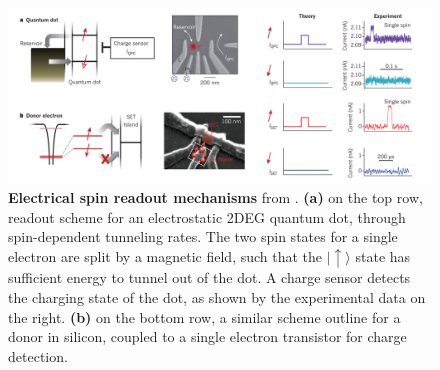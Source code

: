 \documentclass[a4paper,11pt]{article}
\newcommand{\ket}[1]{| #1 \rangle}
\begin{document}
\begin{figure}[h]
\centering
\includegraphics[width = 1\textwidth]{figures/QD_donor_readout.png}
\caption{ {\bf Electrical spin readout mechanisms} from \cite{morton_embracing_2011}. {\bf(a)} on the top row, readout scheme for an electrostatic 2DEG quantum dot, through spin-dependent tunneling rates. The two spin states for a single electron are split by a magnetic field, such that the $\ket{\uparrow}$ state has sufficient energy to tunnel out of the dot. A charge sensor detects the charging state of the dot, as shown by the experimental data on the right. {\bf (b)} on the bottom row, a similar scheme outline for a donor in silicon, coupled to a single electron transistor for charge detection.}
\label{fig:QD_RO}
\end{figure}
\end{document}
